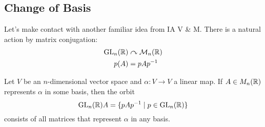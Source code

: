 \documentclass{article}
\begin{document}
\subsection{Change of Basis}
Let's make contact with another familiar idea from IA V \& M. There is a natural action by matrix conjugation:
\begin{align*}
    \mathrm{GL}_n(\mathbb{R}) &\curvearrowright \mathcal{M}_n(\mathbb{R}) \\
    p(A) &= pAp^{-1}
\end{align*}
\begin{prop}
    Let $V$ be an $n$-dimensional vector space and $\alpha: V \rightarrow V$ a linear map.
    If $A \in M_n(\mathbb{R})$ represents $\alpha$ in some basis, then the orbit
    \[
        \mathrm{GL}_n(\mathbb{R})A = \{pAp^{-1} \mid p \in \mathrm{GL}_n(\mathbb{R})\}  
    \]
    consists of all matrices that represent $\alpha$ in any basis.
\end{prop}
\end{document}
